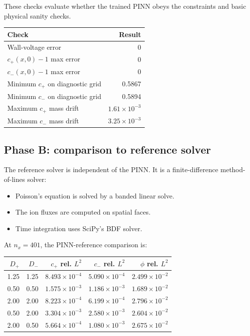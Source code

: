 \documentclass[11pt]{article}
\newcommand{\cp}{c_{+}}
\newcommand{\cn}{c_{-}}
\newcommand{\ph}{\phi}
\newcommand{\Dp}{D_{+}}
\newcommand{\Dn}{D_{-}}
\begin{document}
These checks evaluate whether the trained PINN obeys the constraints and basic
physical sanity checks.

\begin{center}
\begin{tabular}{lr}
\toprule
Check & Result \\
\midrule
Wall-voltage error & 0 \\
$\cp(x,0)-1$ max error & 0 \\
$\cn(x,0)-1$ max error & 0 \\
Minimum $\cp$ on diagnostic grid & 0.5867 \\
Minimum $\cn$ on diagnostic grid & 0.5894 \\
Maximum $\cp$ mass drift & $1.61\times10^{-3}$ \\
Maximum $\cn$ mass drift & $3.25\times10^{-3}$ \\
\bottomrule
\end{tabular}
\end{center}

\subsection*{Phase B: comparison to reference solver}

The reference solver is independent of the PINN. It is a finite-difference
method-of-lines solver:

\begin{itemize}
  \item Poisson's equation is solved by a banded linear solve.
  \item The ion fluxes are computed on spatial faces.
  \item Time integration uses SciPy's BDF solver.
\end{itemize}

At $n_x=401$, the PINN-reference comparison is:

\begin{center}
\begin{tabular}{rrrrr}
\toprule
$\Dp$ & $\Dn$ & $\cp$ rel. $L^2$ & $\cn$ rel. $L^2$ & $\ph$ rel. $L^2$ \\
\midrule
1.25 & 1.25 & $8.493\times10^{-4}$ & $5.090\times10^{-4}$ & $2.499\times10^{-2}$ \\
0.50 & 0.50 & $1.575\times10^{-3}$ & $1.186\times10^{-3}$ & $1.689\times10^{-2}$ \\
2.00 & 2.00 & $8.223\times10^{-4}$ & $6.199\times10^{-4}$ & $2.796\times10^{-2}$ \\
0.50 & 2.00 & $3.304\times10^{-3}$ & $2.580\times10^{-3}$ & $2.604\times10^{-2}$ \\
2.00 & 0.50 & $5.664\times10^{-4}$ & $1.080\times10^{-3}$ & $2.675\times10^{-2}$ \\
\bottomrule
\end{tabular}
\end{center}
\end{document}
